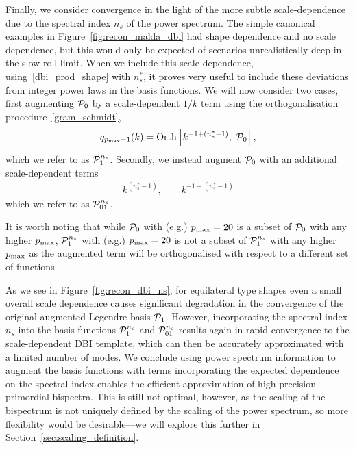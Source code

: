 Finally, we consider convergence in the light of the more subtle scale-dependence due to
the spectral index $n_s$ of the power spectrum.
The simple canonical examples in Figure~\ref{fig:recon_malda_dbi} had shape dependence and no scale dependence,
but this would only be expected of scenarios unrealistically deep in the slow-roll limit.
When we include this scale dependence, using~\eqref{dbi_prod_shape} with $n^*_s$, 
it proves very useful to include these deviations from
integer power laws in the basis functions.  We will now consider two cases, first augmenting
$\mathcal{P}_0$ by a scale-dependent $1/k$ term using the orthogonalisation procedure~\eqref{gram_schmidt}, 
\begin{align}\label{Lns_inv}
    q_{p_\text{max}-1}(k) = \text{Orth}\left[{k^{-1+(n_s^{*}-1)}},~\mathcal{P}_0\right],
\end{align}
which we refer to as $\mathcal{P}^{n_s}_1$.
Secondly, we instead augment $\mathcal{P}_0$ with an additional scale-dependent terms
\begin{align}\label{Lns_both}
    {k^{(n_s^{*}-1)}},\qquad{k^{-1+(n_s^{*}-1)}}
\end{align}
which we refer to as $\mathcal{P}^{n_s}_{01}$.


    It is worth noting that while $\mathcal{P}_0$ with (e.g.) $p_\text{max}=20$ is a subset of
    $\mathcal{P}_0$ with any higher $p_\text{max}$, $\mathcal{P}^{n_s}_1$ with (e.g.) $p_\text{max}=20$ is not a subset of
    $\mathcal{P}^{n_s}_1$ with any higher $p_\text{max}$ as the augmented term will be orthogonalised
    with respect to a different set of functions.


As we see in Figure~\ref{fig:recon_dbi_ns}, for equilateral type shapes
even a small overall scale dependence causes significant degradation in the convergence of
the original augmented Legendre basis $\mathcal{P}_1$.
However, incorporating the spectral index $n_s$  into the basis functions $\mathcal{P}^{n_s}_1$ and $\mathcal{P}^{n_s}_{01}$
results again in rapid convergence to the scale-dependent DBI template, which can then be accurately
approximated with a limited number of modes.
We conclude using power spectrum information to augment the basis functions with terms incorporating the expected dependence
on the spectral index enables the efficient approximation of high precision primordial bispectra.
This is still not optimal, however, as the scaling of the bispectrum is not uniquely defined by the
scaling of the power spectrum, so more flexibility would be desirable---we will explore this further
in Section~\ref{sec:scaling_definition}.


